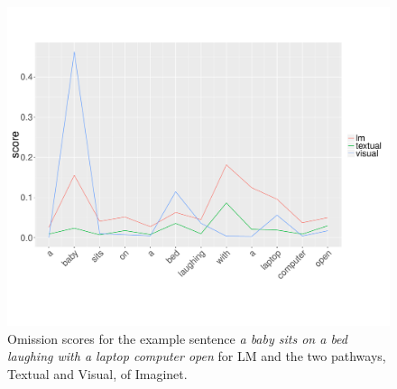 


\begin{figure}[t]
  \centering
  \includegraphics[scale=0.3]{omissionex.pdf}
  \caption{Omission scores for the example sentence {\it a baby sits
      on a bed laughing with a laptop computer open} for {\sc LM} and
    the two pathways, {\sc Textual} and {\sc Visual}, of {\sc
      Imaginet.}}
  \label{fig:omissionex}
\end{figure}

